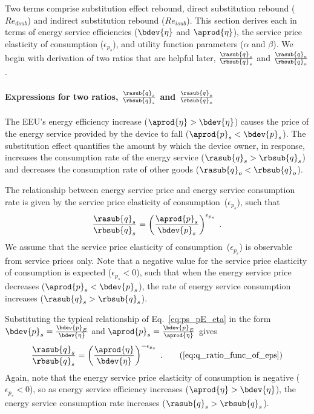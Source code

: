 \subsubsection{\Subeffect{}} 
\label{sec:Re_sub}

Two terms comprise substitution effect rebound,
direct substitution rebound ($Re_{dsub}$) and
indirect substitution rebound ($Re_{isub}$).
This section derives each in terms of energy service efficiencies ($\bdev{\eta}$ and $\aprod{\eta}$),
the service price elasticity of consumption ($\epsilon_{p_s}$), and
utility function parameters ($\alpha$ and $\beta$).
We begin with derivation of two ratios that are helpful later,
$\frac{\rasub{q}_s}{\rbsub{q}_s}$ and
$\frac{\rasub{q}_o}{\rbsub{q}_o}$.


\paragraph{Expressions for two ratios, $\frac{\rasub{q}_s}{\rbsub{q}_s}$ and $\frac{\rasub{q}_o}{\rbsub{q}_o}$}
\label{sec:two_ratios}

The EEU's energy efficiency increase
($\aprod{\eta} > \bdev{\eta}$)
causes the price of the energy service provided by the device to fall
($\aprod{p}_s < \bdev{p}_s$).
The substitution effect quantifies the amount by which
the device owner, in response,
increases the consumption rate of the energy service ($\rasub{q}_s > \rbsub{q}_s$) and
decreases the consumption rate of other goods ($\rasub{q}_o < \rbsub{q}_o$).

The relationship between energy service price and energy service consumption rate
is given by the service price elasticity of consumption~($\epsilon_{p_s}$),
such that
%
\begin{equation}
  \frac{\rasub{q}_s}{\rbsub{q}_s} = \left( \frac{\aprod{p}_s}{\bdev{p}_s} \right)^{\epsilon_{p_s}} \; .
\end{equation}
%
We assume that the service price elasticity of consumption~($\epsilon_{p_s}$) is observable
from service prices only.
Note that a negative value for the service price elasticity of consumption is expected ($\epsilon_{p_s} < 0$),
such that when the energy service price decreases ($\aprod{p}_s < \bdev{p}_s$),
the rate of energy service consumption increases ($\rasub{q}_s > \rbsub{q}_s$).

Substituting the typical relationship of Eq.~\ref{eq:ps_pE_eta} in the form
$\bdev{p}_s = \frac{\bdev{p}_E}{\bdev{\eta}}$ and
$\aprod{p}_s = \frac{\bdev{p}_E}{\aprod{\eta}}$
gives
%
\begin{equation}
  \frac{\rasub{q}_s}{\rbsub{q}_s} = \left( \frac{\aprod{\eta}}{\bdev{\eta}} \right)^{-\epsilon_{p_s}} \; .
                                                                        \tag{\ref{eq:q_ratio_func_of_eps}}
\end{equation}
%
Again, note that the energy service price elasticity of consumption
is negative ($\epsilon_{p_s} < 0$), so
as energy service efficiency increases ($\aprod{\eta} > \bdev{\eta}$),
the energy service consumption rate increases ($\rasub{q}_s > \rbsub{q}_s$).

